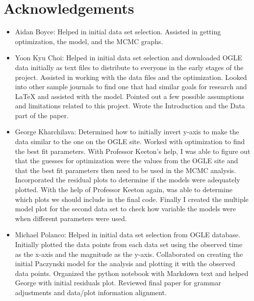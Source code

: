 \documentclass{article}
\begin{document}
 \section{Acknowledgements}
 \begin{itemize}
 
\item Aidan Boyce: Helped in initial data set selection. Assisted in getting optimization, the model, and the MCMC graphs. 

\item Yoon Kyu Choi: Helped in initial data set selection and  downloaded OGLE data initially as text files to distribute to everyone in the early stages of the project. Assisted in working with the data files and the optimization. Looked into other sample journals to find one that had similar goals for research and LaTeX and assisted with the model. Pointed out a few possible assumptions and limitations related to this project. Wrote the Introduction and the Data part of the paper.

\item George Kharchilava: Determined how to initially invert y-axis to make the data similar to the one on the OGLE site. Worked with optimization to find the best fit parameters. With Professor Keeton's help, I was able to figure out that the guesses for optimization were the values from the OGLE site and that the best fit parameters then need to be used in the MCMC analysis. Incorporated the residual plots to determine if the models were adequately plotted. With the help of Professor Keeton again, was able to determine which plots we should include in the final code. Finally I created the multiple model plot for the second data set to check how variable the models were when different parameters were used. 

\item Michael Polanco: Helped in initial data set selection from OGLE database. Initially plotted the data points from each data set using the observed time as the x-axis and the magnitude as the y-axis. Collaborated on creating the initial Paczynski model for the analysis and plotting it with the observed data points. Organized the python notebook with Markdown text and helped George with initial residuals plot. Reviewed final paper for grammar adjustments and data/plot information alignment.


\end{itemize}
\end{document}
